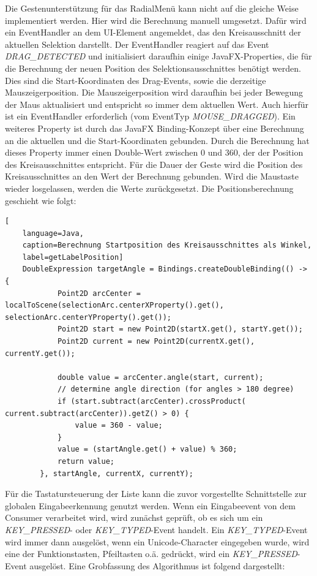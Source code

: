 Die Gestenunterstützung für das RadialMenü kann nicht auf die gleiche Weise implementiert werden. Hier wird die Berechnung manuell umgesetzt. Dafür wird ein EventHandler an dem UI-Element angemeldet, das den Kreisausschnitt der aktuellen Selektion darstellt. Der EventHandler reagiert auf das Event \textit{DRAG\_{}DETECTED} und initialisiert daraufhin einige JavaFX-Properties, die für die Berechnung der neuen Position des Selektionsausschnittes benötigt werden. Dies sind die Start-Koordinaten des Drag-Events, sowie die derzeitige Mauszeigerposition. Die Mauszeigerposition wird daraufhin bei jeder Bewegung der Maus aktualisiert und entspricht so immer dem aktuellen Wert. Auch hierfür ist ein EventHandler erforderlich (vom EventTyp \textit{MOUSE\_{}DRAGGED}). Ein weiteres Property ist durch das JavaFX Binding-Konzept über eine Berechnung an die aktuellen und die Start-Koordinaten gebunden. Durch die Berechnung hat dieses Property immer einen Double-Wert zwischen 0 und 360, der der Position des Kreisausschnittes entspricht. Für die Dauer der Geste wird die Position des Kreisausschnittes an den Wert der Berechnung gebunden. Wird die Maustaste wieder losgelassen, werden die Werte zurückgesetzt. Die Positionsberechnung geschieht wie folgt:\par
\begin{lstlisting}[
    language=Java,
    caption=Berechnung Startposition des Kreisausschnittes als Winkel,
    label=getLabelPosition]
    DoubleExpression targetAngle = Bindings.createDoubleBinding(() -> {
            Point2D arcCenter = localToScene(selectionArc.centerXProperty().get(), selectionArc.centerYProperty().get());
            Point2D start = new Point2D(startX.get(), startY.get());
            Point2D current = new Point2D(currentX.get(), currentY.get());

            double value = arcCenter.angle(start, current);
            // determine angle direction (for angles > 180 degree)
            if (start.subtract(arcCenter).crossProduct( current.subtract(arcCenter)).getZ() > 0) {
                value = 360 - value;
            }
            value = (startAngle.get() + value) % 360;
            return value;
        }, startAngle, currentX, currentY);
\end{lstlisting}
Für die Tastatursteuerung der Liste kann die zuvor vorgestellte Schnittstelle zur globalen Eingabeerkennung genutzt werden. Wenn ein Eingabeevent von dem Consumer verarbeitet wird, wird zunächst geprüft, ob es sich um ein \textit{KEY\_{}PRESSED}- oder \textit{KEY\_{}TYPED}-Event handelt. Ein \textit{KEY\_{}TYPED}-Event wird immer dann ausgelöst, wenn ein Unicode-Character eingegeben wurde, wird eine der Funktionstasten, Pfeiltasten o.ä. gedrückt, wird ein \textit{KEY\_{}PRESSED}-Event ausgelöst. Eine Grobfassung des Algorithmus ist folgend dargestellt:\par
